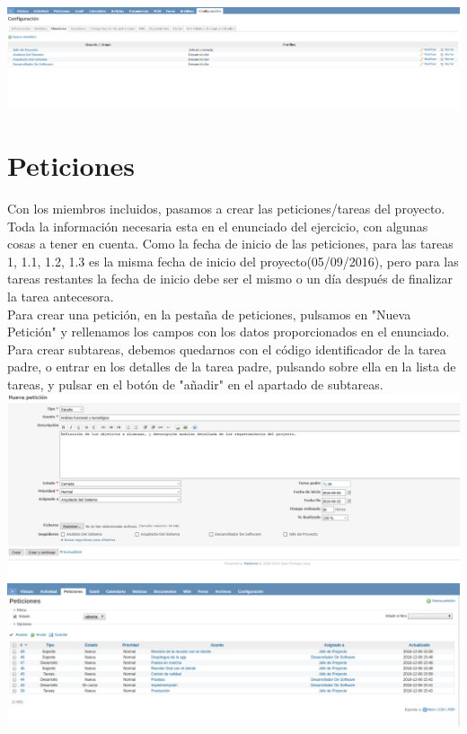 \documentclass[a4paper,10pt]{scrartcl}
\begin{document}
	\includegraphics[width=15cm]{Miembros}



\section{Peticiones}

Con los miembros incluidos, pasamos a crear las peticiones/tareas del proyecto. Toda la información necesaria esta en el enunciado del ejercicio, con algunas cosas a tener en cuenta. Como la fecha de inicio de las peticiones, para las tareas 1, 1.1, 1.2, 1.3 es la misma fecha de inicio del proyecto(05/09/2016), pero para las tareas restantes la fecha de inicio debe ser el mismo o un día después de finalizar la tarea antecesora.\\

Para crear una petición, en la pestaña de peticiones, pulsamos en "Nueva Petición" y rellenamos los campos con los datos proporcionados en el enunciado. Para crear subtareas, debemos quedarnos con el código identificador de la tarea padre, o entrar en los detalles de la tarea padre, pulsando sobre ella en la lista de tareas, y pulsar en el botón de "añadir" en el apartado de subtareas.\\

\includegraphics[width=\linewidth]{NuevaPeticion}\\

\includegraphics[width=\linewidth]{peticiones}
\end{document}
